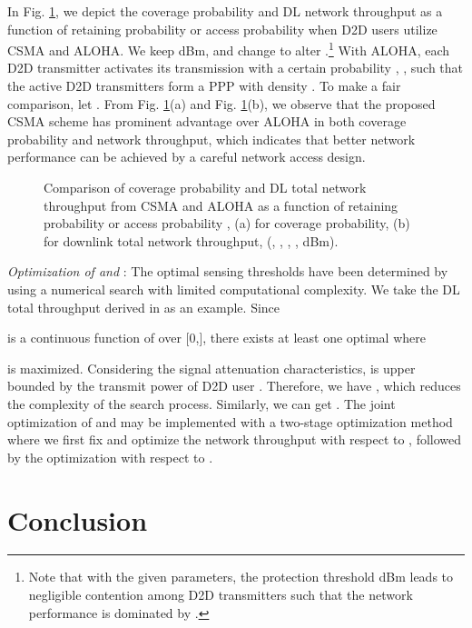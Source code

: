 \documentclass[twocolumn,english]{IEEEtran}
\theoremstyle{plain}
\theoremstyle{definition}
\begin{document}
In Fig. \ref{fig:CSMA_ALOHA_Compare}, we depict the coverage probability
and DL network throughput as a function of retaining probability 
or access probability  when D2D users utilize CSMA and ALOHA.
We keep  dBm, and change 
to alter .\footnote{Note that with the given parameters, the protection threshold 
dBm leads to negligible contention among D2D transmitters such that
the network performance is dominated by .} With ALOHA, each D2D transmitter activates its transmission with
a certain probability , , such that the active D2D
transmitters form a PPP with density . To
make a fair comparison, let . From Fig. \ref{fig:CSMA_ALOHA_Compare}(a)
and Fig. \ref{fig:CSMA_ALOHA_Compare}(b), we observe that the proposed
CSMA scheme has prominent advantage over ALOHA in both coverage probability
and network throughput, which indicates that better network performance
can be achieved by a careful network access design.

\begin{figure}[t]


\protect\caption{\label{fig:CSMA_ALOHA_Compare}Comparison of coverage probability
and DL total network throughput from CSMA and ALOHA as a function
of retaining probability  or access probability , (a)
for coverage probability, (b) for downlink total network throughput,
(, ,
, ,
 dBm). }
\end{figure}


\emph{Optimization of  and }:
The optimal sensing thresholds have been determined by using a numerical
search with limited computational complexity. We take the DL total
throughput derived in  as an example. Since

is a continuous function of  over {[}0,{]},
there exists at least one optimal  where

is maximized. Considering the signal attenuation characteristics,
 is upper bounded by the transmit power
of D2D user . Therefore, we have ,
which reduces the complexity of the search process. Similarly, we
can get . The joint
optimization of  and  may
be implemented with a two-stage optimization method where we first
fix  and optimize the network throughput with
respect to , followed by the optimization with
respect to .


\section{Conclusion}
\end{document}
